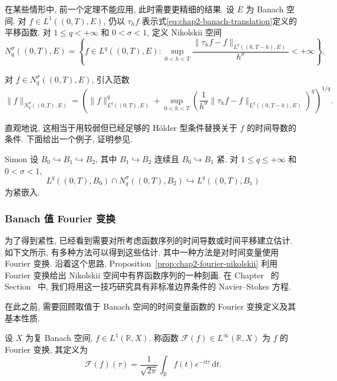 在某些情形中, 前一个定理不能应用, 此时需要更精细的结果. 设 $E$ 为 Banach 空间. 对 $f\in L^1((0,T),E)$, 仍以 $\tau_hf$ 表示式\eqref{eq:chap2-banach-translation}定义的平移函数. 对 $1\leq q<+\infty$ 和 $0<\sigma<1$, 定义 Nikolskii 空间
\begin{equation}
 N_q^\sigma((0,T),E)=\left\{f\in L^q((0,T),E):
 \sup_{0<h<T}\frac{\|\tau_hf-f\|_{L^q((0,T-h),E)}}{h^\sigma}<+\infty\right\}.
 \label{eq:chap2-nikolskii-space}
\end{equation}

对 $f\in N_q^\sigma((0,T),E)$, 引入范数
\[
 \|f\|_{N_q^\sigma((0,T),E)}
 =\left(
 \|f\|_{L^q((0,T),E)}^q
 +\sup_{0<h<T}
 \left(\frac1{h^\sigma}
 \|\tau_hf-f\|_{L^q((0,T-h),E)}\right)^q
 \right)^{1/q}.
\]

直观地说, 这相当于用较弱但已经足够的 H\"older 型条件替换关于 $f$ 的时间导数的条件. 下面给出一个例子, 证明参见.

\begin{Theorem}{Simon}
\label{thm:chap2-simon-nikolskii-compactness}
设 $B_0\hookrightarrow B_1\hookrightarrow B_2$, 其中 $B_1\hookrightarrow B_2$ 连续且 $B_0\hookrightarrow B_1$ 紧. 对 $1\leq q\leq+\infty$ 和 $0<\sigma<1$,
\[
 L^q((0,T),B_0)\cap N_q^\sigma((0,T),B_2)
 \hookrightarrow L^q((0,T),B_1)
\]
为紧嵌入.
\end{Theorem}

\subsubsection{Banach 值 Fourier 变换}
\label{subsec:chap2-banach-fourier}

为了得到紧性, 已经看到需要对所考虑函数序列的时间导数或时间平移建立估计. 如下文所示, 有多种方法可以得到这些估计. 其中一种方法是对时间变量使用 Fourier 变换. 沿着这个思路, Proposition~\ref{prop:chap2-fourier-nikolskii} 利用 Fourier 变换给出 Nikolskii 空间中有界函数序列的一种刻画. 在 Chapter~ 的 Section~ 中, 我们将用这一技巧研究具有非标准边界条件的 Navier--Stokes 方程.

在此之前, 需要回顾取值于 Banach 空间的时间变量函数的 Fourier 变换定义及其基本性质.

\begin{Definition}
\label{def:chap2-banach-fourier-transform}
设 $X$ 为复 Banach 空间, $f\in L^1(\mathbb{R},X)$. 称函数 $\mathcal{F}(f)\in L^\infty(\mathbb{R},X)$ 为 $f$ 的 Fourier 变换, 其定义为
\[
 \mathcal{F}(f)(\tau)=\frac1{\sqrt{2\pi}}\int_\mathbb{R}f(t)e^{-it\tau}\,\mathrm{d}t.
\]
\end{Definition}

